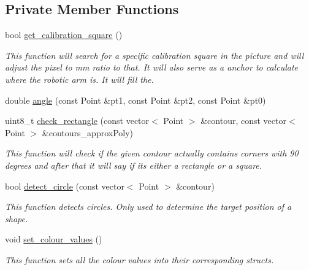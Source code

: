 \subsection*{Private Member Functions}
\begin{DoxyCompactItemize}
\item 
bool \hyperlink{class_vision_aef09b275d4c09a766fc01e92a8e2e774}{get\+\_\+calibration\+\_\+square} ()
\begin{DoxyCompactList}\small\item\em This function will search for a specific calibration square in the picture and will adjust the pixel to mm ratio to that. It will also serve as a anchor to calculate where the robotic arm is. It will fill the. \end{DoxyCompactList}\item 
double \hyperlink{class_vision_a985c230f753e693678b1c808204c746b}{angle} (const Point \&pt1, const Point \&pt2, const Point \&pt0)
\item 
uint8\+\_\+t \hyperlink{class_vision_a2b78b716ed430b2f9d09ea918e752e6b}{check\+\_\+rectangle} (const vector$<$ Point $>$ \&contour, const vector$<$ Point $>$ \&contours\+\_\+approx\+Poly)
\begin{DoxyCompactList}\small\item\em This function will check if the given contour actually contains corners with 90 degrees and after that it will say if its either a rectangle or a square. \end{DoxyCompactList}\item 
bool \hyperlink{class_vision_a72b289b68ecb074480f27733dff5eab0}{detect\+\_\+circle} (const vector$<$ Point $>$ \&contour)
\begin{DoxyCompactList}\small\item\em This function detects circles. Only used to determine the target position of a shape. \end{DoxyCompactList}\item 
void \hyperlink{class_vision_ae3f60088ee2306eb73f6f76aea46cdae}{set\+\_\+colour\+\_\+values} ()
\begin{DoxyCompactList}\small\item\em This function sets all the colour values into their corresponding structs. \end{DoxyCompactList}\end{DoxyCompactItemize}
